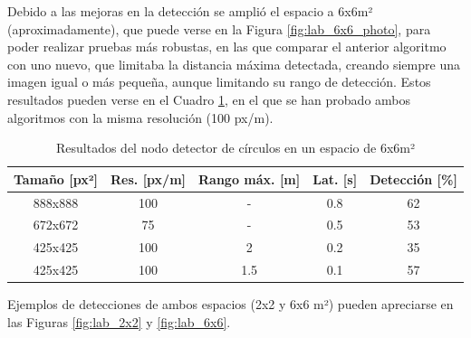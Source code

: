 Debido a las mejoras en la detección se amplió el espacio a 6x6m²
(aproximadamente), que puede verse  en la Figura \ref{fig:lab_6x6_photo}, para
poder realizar pruebas más robustas, en las que comparar el anterior algoritmo
con uno nuevo, que limitaba la distancia máxima detectada, creando siempre una
imagen igual o más pequeña, aunque limitando su rango de detección.
Estos resultados pueden verse en el Cuadro \ref{tab:circle_results_6x6}, en el
que se han probado ambos algoritmos con la misma resolución (100 px/m).
\\

\begin{table}[h!]
\begin{center}
\begin{tabular}{|c|c|c|c|c|}
\hline
\textbf{Tamaño [px²]} & \textbf{Res. [px/m]} & \textbf{Rango máx. [m]} & \textbf{Lat. [s]} & \textbf{Detección [\%]}  \\
\hline
888x888 & 100 & -   & 0.8 & 62  \\
672x672 & 75  & -   & 0.5 & 53  \\
\hline
425x425 & 100 & 2   & 0.2 & 35  \\
425x425 & 100 & 1.5 & 0.1 & 57  \\
\hline
\end{tabular}
\caption{Resultados del nodo detector de círculos en un espacio de 6x6m²}
\label{tab:circle_results_6x6}
\end{center}
\end{table}

Ejemplos de detecciones de ambos espacios (2x2 y 6x6 m²) pueden apreciarse en
las Figuras \ref{fig:lab_2x2} y \ref{fig:lab_6x6}.
\\

